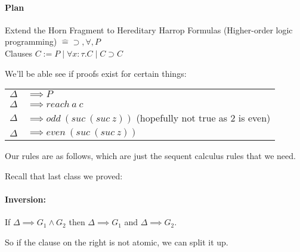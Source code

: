 \documentclass[12 pt]{article}
\begin{document}
	\paragraph{Plan} Extend the Horn Fragment to Hereditary Harrop
	Formulas (Higher-order logic programming) $\hat{=} \supset,
\forall, P$
	\\ Clauses $C := P \mid \forall x : \tau.C \mid C \supset C$

	We'll be able see if proofs exist for certain things:
	\\
	\begin{tabular}{l l}
		$\Delta$ & $\implies P$
		\\ $\Delta$ & $\implies reach\ a \ c$
		\\ $\Delta$ & $\implies odd\ (suc\ (suc\ z))$ (hopefully not true as $2$ is even)
		\\ $\Delta$ & $\implies even\ (suc\ (suc\ z))$
	\end{tabular}
	Our rules are as follows, which are just the
	sequent calculus rules that we need.
	\begin{center}
		\DP
		\DP
		\DP
		\DP
	\end{center}
	Recall that last class we proved:
	\paragraph{Inversion:} If $\Delta \implies G_1 \land G_2$ then
$\Delta \implies G_1$ and $\Delta \implies G_2$.

	So if the clause on the right is not atomic, we can split it
	up.
\end{document}
